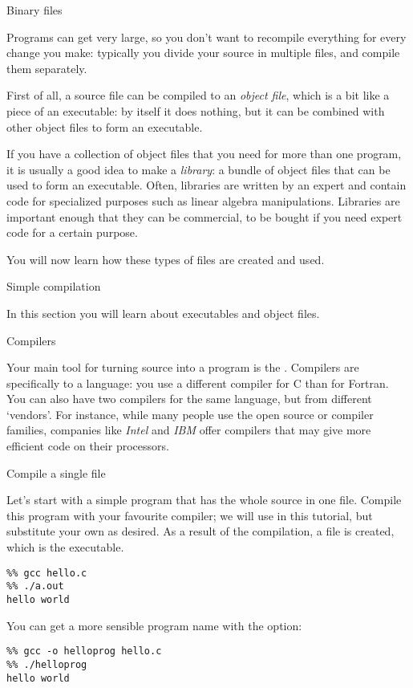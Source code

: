  {Binary files}

Programs can get very large, so  you don't want to recompile
everything for every change you make: typically you divide your source
in multiple files, and compile them separately.

First of all, a source file can be compiled to an \emph{object file}, which is
  a bit like a piece of an executable: by itself it does nothing, but
  it can be combined with other object files to form an executable.

If you have a collection of object files that you need for more than
one program, it is usually a good idea to make a 
\emph{library}: a bundle of object files that can be used to
  form an executable. Often, libraries are written by an expert and
  contain code for specialized purposes such as linear algebra
  manipulations. Libraries are important enough that they can be
  commercial, to be bought if you need expert code for a certain purpose.

You will now learn how these types of files are created and used.

 {Simple compilation}

\begin{purpose}
  In this section you will learn about executables and object files.
\end{purpose}

 {Compilers}

Your main tool for turning source into a program is the
. Compilers are specifically to a language: you
use a different compiler for C than for Fortran.
You can also have two compilers for the same language, but from
different `vendors'. For instance, while many people use the open
source  or  compiler families,
companies like \emph{Intel} and
\emph{IBM} offer compilers that may give more
efficient code on their processors.

 {Compile a single file}

Let's start with a simple program that has the whole source in one
file.
Compile this program with your favourite compiler; we will use 
in this tutorial, but substitute your own as desired. As a result of
the compilation, a file  is created, which is the executable.
\begin{verbatim}
%% gcc hello.c
%% ./a.out
hello world
\end{verbatim}
You can get a more sensible program name with the  option:
\begin{verbatim}
%% gcc -o helloprog hello.c
%% ./helloprog
hello world
\end{verbatim}

